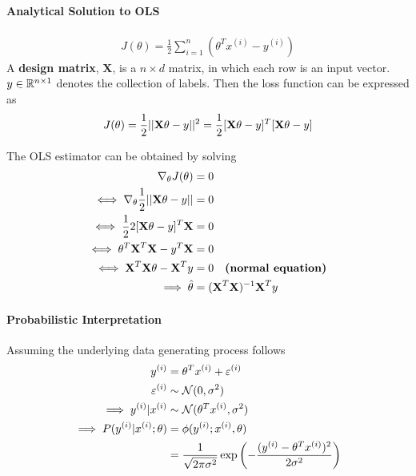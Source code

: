 \documentclass{report}
\begin{document}
        \paragraph{Analytical Solution to OLS}
        \begin{align}
            J(\theta) = \frac{1}{2} \sum_{i=1}^n \left(\theta^T x^{(i)} - y^{(i)}\right)
        \end{align}
        A \textbf{design matrix}, $\textbf{X}$, is a $n \times d$ matrix, in which each row is an input vector. $y \in \mathbb{R}^{n \times 1}$ denotes the collection of labels. Then the loss function can be expressed as
        \begin{align}
            J(\theta) = \frac{1}{2} \vert \vert {\textbf{X}\theta - y} \vert \vert^2 = \frac{1}{2} [\textbf{X}\theta - y]^T [\textbf{X}\theta - y]
        \end{align}
        
        The OLS estimator can be obtained by solving
        \begin{align}
            \nabla_\theta J(\theta) &= 0 \\
            \iff \nabla_\theta \frac{1}{2} \vert \vert {\textbf{X}\theta - y} \vert \vert &= 0 \\
            \iff \frac{1}{2} 2 [\textbf{X}\theta - y]^T \textbf{X} &= 0 \\
            \iff \theta^T \textbf{X}^T \textbf{X} - y^T \textbf{X} &= 0\\
            \iff \textbf{X}^T \textbf{X} \theta - \textbf{X}^T y &= 0 \quad \textbf{(normal equation)}\\
            \implies \hat{\theta} &= (\textbf{X}^T \textbf{X})^{-1} \textbf{X}^T y
        \end{align}
        \paragraph{Probabilistic Interpretation} Assuming the underlying data generating process follows
        \begin{align}
            y^{(i)} &= \theta^T x^{(i)} + \varepsilon^{(i)} \\
            \varepsilon^{(i)} &\sim \mathcal{{N}}(0, \sigma^2) \\
            \implies y^{(i)}|x^{(i)} &\sim \mathcal{{N}}(\theta^T x^{(i)}, \sigma^2) \\
            \implies P(y^{(i)}|x^{(i)}; \theta) &= \phi(y^{(i)}; x^{(i)}, \theta) \\
            &= \frac{1}{\sqrt{2\pi \sigma^2}} \exp\left(
                -\frac{(y^{(i)} - \theta^T x^{(i)})^2}{2 \sigma^2}
            \right)
        \end{align}
\end{document}
